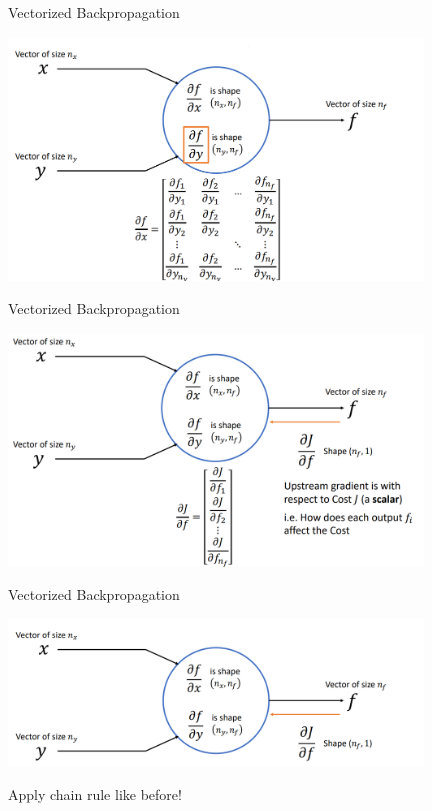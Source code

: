 \documentclass[serif, aspectratio=169]{beamer}
\begin{document}
\begin{frame}{Vectorized Backpropagation}
    \begin{center}
        \includegraphics[width=11cm]{pic/vec3.png}  
    \end{center}
\end{frame}

\begin{frame}{Vectorized Backpropagation}
    \begin{center}
        \includegraphics[width=11cm]{pic/vec4.png}  
    \end{center}
\end{frame}


\begin{frame}{Vectorized Backpropagation}

    \begin{center}
        \includegraphics[width=11cm]{pic/vec5.png}  
    \end{center}
    Apply chain rule like before!
\end{frame}
\end{document}
